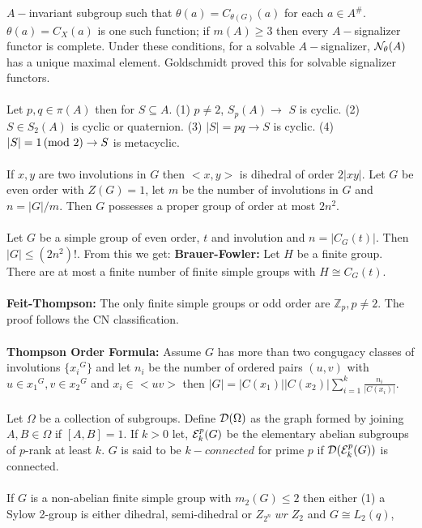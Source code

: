 $A-$invariant subgroup such that
$\theta(a)= C_{\theta(G)}(a)$ for each $a \in A^{\#}$.  $\theta(a)=C_X(a)$ is one such
function; if $m(A)  \ge 3$ then every $A-$signalizer functor is complete.  Under these
conditions, for a solvable $A-$signalizer, ${\cal N}_{\theta}(A)$ has a unique maximal
element.  Goldschmidt proved this for solvable signalizer functors.\\
\\
Let $p,q \in \pi(A)$ then for $S \subseteq A$. (1) $p \ne 2$, $S_p(A) \rightarrow$ $S$ is
cyclic.  (2) $S \in S_2(A)$ is cyclic or quaternion.  
(3) $|S|=pq \rightarrow S$ is cyclic.
(4) $|S|= 1 \thinspace \textnormal{(mod } 2 \textnormal{)} \rightarrow S$ is metacyclic.\\
\\
If $x,y$ are two involutions in $G$ then $<x, y>$ is dihedral of order $2|xy|$.
Let $G$ be even order with $Z(G)=1$, let $m$ be the number of involutions in $G$
and $n=|G|/m$.  Then $G$ possesses a proper group of order at most $2 n^2$.\\
\\
Let $G$ be a simple group of even order,
$t$ and involution and $n= |C_G (t)|$.  Then $|G| \le (2n^2)!$. From this we get:
{\bf Brauer-Fowler:}  Let $H$ be a finite group.   There are at most a finite number
of finite simple groups with $H \cong C_G (t)$.\\
\\
{\bf Feit-Thompson:}  The only finite simple groups or odd order are
${\mathbb Z}_p, p\ne 2$. The proof follows the CN classification.\\
\\
{\bf Thompson Order Formula:}
Assume $G$ has more than two congugacy classes of involutions
$\{ {x_i}^G \}$ and let $n_i$ be the number of ordered pairs $(u, v)$ with
$u \in {x_1}^G, v \in {x_2}^G$ and $x_i \in < uv>$ then
$|G|= |C(x_1 )| |C(x_2 )| \sum_{i=1}^k {\frac {n_i} {|C(x_i )|}}$.\\
\\
Let $\Omega$ be a collection of subgroups.  Define ${\cal D} (\Omega)$ as the graph
formed by joining $A,B \in \Omega$ if $[A,B]=1$. If $k>0$ let, 
${\cal E}^p_k (G)$
be the elementary abelian subgroups of $p$-rank at least $k$. $G$ is said to be
$k-connected$ for prime $p$ if ${\cal D} ( {\cal E}^p_k (G))$
is connected.\\
\\
If $G$ is a non-abelian finite simple group
with $m_2(G) \le 2$ then either (1) a Sylow 2-group is either dihedral, semi-dihedral
or $Z_{2^n} \; wr \; Z_2$ and
$G \cong L_2(q)$,
